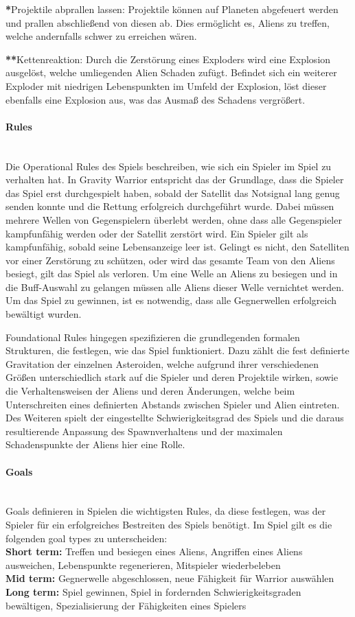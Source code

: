 \documentclass[11pt]{scrartcl}
\newcommand{\lbparagraph}[1]{\paragraph*{#1}\mbox{}\\}
\begin{document}
\textbf{*}Projektile abprallen lassen: Projektile können auf Planeten abgefeuert werden und prallen abschließend von diesen ab. Dies ermöglicht es, Aliens zu treffen, welche andernfalls schwer zu erreichen wären.

\textbf{**}Kettenreaktion: Durch die Zerstörung eines Exploders wird eine Explosion ausgelöst, welche umliegenden Alien Schaden zufügt. Befindet sich ein weiterer Exploder mit niedrigen Lebenspunkten im Umfeld der Explosion, löst dieser ebenfalls eine Explosion aus, was das Ausmaß des Schadens vergrößert. 


\lbparagraph{Rules}
Die Operational Rules des Spiels beschreiben, wie sich ein Spieler im Spiel zu verhalten hat\cite{K2011}. In Gravity Warrior entspricht das der Grundlage, dass die Spieler das Spiel erst durchgespielt haben, sobald der Satellit das Notsignal lang genug senden konnte und die Rettung erfolgreich durchgeführt wurde. Dabei müssen mehrere Wellen von Gegenspielern überlebt werden, ohne dass alle Gegenspieler kampfunfähig werden oder der Satellit zerstört wird. Ein Spieler gilt als kampfunfähig, sobald seine Lebensanzeige leer ist. Gelingt es nicht, den Satelliten vor einer Zerstörung zu schützen, oder wird das gesamte Team von den Aliens besiegt, gilt das Spiel als verloren. Um eine Welle an Aliens zu besiegen und in die Buff-Auswahl zu gelangen müssen alle Aliens dieser Welle vernichtet werden. Um das Spiel zu gewinnen, ist es notwendig, dass alle Gegnerwellen erfolgreich bewältigt wurden.

Foundational Rules hingegen spezifizieren die grundlegenden formalen Strukturen, die festlegen, wie das Spiel funktioniert\cite{K2011}. Dazu zählt die fest definierte Gravitation der einzelnen Asteroiden, welche aufgrund ihrer verschiedenen Größen unterschiedlich stark auf die Spieler und deren Projektile wirken, sowie die Verhaltensweisen der Aliens und deren Änderungen, welche beim Unterschreiten eines definierten Abstands zwischen Spieler und Alien eintreten. Des Weiteren spielt der eingestellte Schwierigkeitsgrad des Spiels und die daraus resultierende Anpassung des Spawnverhaltens und der maximalen Schadenspunkte der Aliens hier eine Rolle.
\lbparagraph{Goals}
Goals definieren in Spielen die wichtigsten Rules, da diese festlegen, was der Spieler für ein erfolgreiches Bestreiten des Spiels benötigt\cite[~p.145]{S2014}. Im Spiel gilt es die folgenden goal types zu unterscheiden: \\
\textbf{Short term:} Treffen und besiegen eines Aliens, Angriffen eines Aliens ausweichen, Lebenspunkte regenerieren, Mitspieler wiederbeleben \\
\textbf{Mid term:} Gegnerwelle abgeschlossen, neue Fähigkeit für Warrior auswählen \\
\textbf{Long term:} Spiel gewinnen, Spiel in fordernden Schwierigkeitsgraden bewältigen, Spezialisierung der Fähigkeiten eines Spielers
\end{document}
